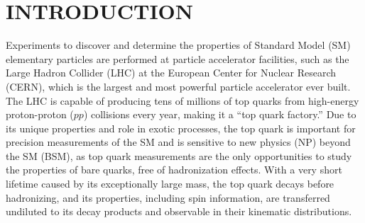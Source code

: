 
\chapter*{INTRODUCTION}
\label{Introduction}
Experiments to discover and determine the properties of Standard Model (SM) elementary particles are performed at particle accelerator facilities, such as the Large Hadron Collider (LHC) at the European Center for Nuclear Research (CERN), which is the largest and most powerful particle accelerator ever built.
The LHC is capable of producing tens of millions of top quarks from high-energy proton-proton ($pp$) collisions every year, making it a ``top quark factory.''
Due to its unique properties and role in exotic processes, the top quark is important for precision measurements of the SM and is sensitive to new physics (NP) beyond the SM (BSM), as top quark measurements are the only opportunities to study the properties of bare quarks, free of hadronization effects.
With a very short lifetime caused by its exceptionally large mass, the top quark decays before hadronizing, and its properties, including spin information, are transferred undiluted to its decay products and observable in their kinematic distributions.


